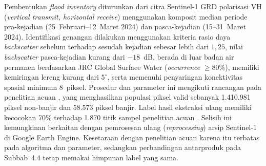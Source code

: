 \documentclass[12pt,a4paper]{article}
\begin{document}
Pembentukan \textit{flood inventory} diturunkan dari citra Sentinel-1 GRD
polarisasi VH (\textit{vertical transmit, horizontal receive}) menggunakan komposit median periode pra-kejadian
(25~Februari--12~Maret 2024) dan pasca-kejadian (15--31~Maret 2024).
Identifikasi genangan dilakukan menggunakan kriteria rasio daya
\textit{backscatter} sebelum terhadap sesudah kejadian sebesar lebih dari
$1{,}25$, nilai \textit{backscatter} pasca-kejadian kurang dari $-18$~dB,
berada di luar badan air permanen berdasarkan JRC Global Surface Water
(\textit{occurrence} $\geq 80\%$), memiliki kemiringan lereng kurang dari
$5^{\circ}$, serta memenuhi penyaringan konektivitas spasial minimum 8~piksel.
Prosedur dan parameter ini mengikuti rancangan pada penelitian acuan
\citep{hakim2026}, yang menghasilkan populasi piksel valid sebanyak 1.410.981
piksel non-banjir dan 58.573 piksel banjir. Label hasil ekstraksi ulang memiliki kecocokan 70\% terhadap 1.870 titik
sampel penelitian acuan \citep{hakim2026}. Selisih ini kemungkinan berkaitan
dengan pemrosesan ulang (\textit{reprocessing}) arsip Sentinel-1 di Google
Earth Engine. Kesetaraan dengan penelitian acuan karena itu terbatas pada
algoritma dan parameter, sedangkan perbandingan antarproduk pada
Subbab~4.4 tetap memakai himpunan label yang sama.
\end{document}
